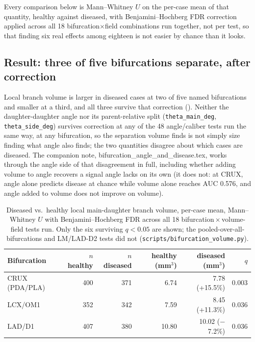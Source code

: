 Every comparison below is Mann--Whitney $U$ on the per-case mean of that quantity, healthy against
diseased, with Benjamini--Hochberg FDR correction applied across all 18 bifurcation$\times$field
combinations run together, not per test, so that finding six real effects among eighteen is not
easier by chance than it looks.

\subsection*{Result: three of five bifurcations separate, after correction}

Local branch volume is larger in diseased cases at two of five named bifurcations and smaller at a
third, and all three survive that correction (). Neither the
daughter-daughter angle nor its parent-relative split (\texttt{theta\_main\_deg},
\texttt{theta\_side\_deg}) survives correction at any of the 48 angle/caliber tests run the same
way, at any bifurcation, so the separation volume finds is not simply size finding what angle also
finds; the two quantities disagree about which cases are diseased. The companion note,
bifurcation\_angle\_and\_disease.tex, works through the angle side of that disagreement in full,
including whether adding volume to angle recovers a signal angle lacks on its own (it does not: at
CRUX, angle alone predicts disease at chance while volume alone reaches AUC 0.576, and angle added
to volume does not improve on volume).

\begin{table}[h]
  \centering
  \caption{Diseased vs.\ healthy local main-daughter branch volume, per-case mean, Mann--Whitney
    $U$ with Benjamini--Hochberg FDR across all 18 bifurcation\,$\times$\,volume-field tests run.
    Only the six surviving $q < 0.05$ are shown; the pooled-over-all-bifurcations and LM/LAD-D2
    tests did not (\texttt{scripts/bifurcation\_volume.py}).}
  \label{tab:week3-volume}
  \begin{tabular}{lrrrrr}
    \hline
    Bifurcation & $n$ healthy & $n$ diseased & healthy (mm$^3$) & diseased (mm$^3$) & $q$ \\
    \hline
    CRUX (PDA/PLA) & 400 & 371 & 6.74 & 7.78 (+15.5\%) & 0.003 \\
    LCX/OM1        & 352 & 342 & 7.59 & 8.45 (+11.3\%) & 0.036 \\
    LAD/D1         & 407 & 380 & 10.80 & 10.02 ($-$7.2\%) & 0.036 \\
    \hline
  \end{tabular}
\end{table}

